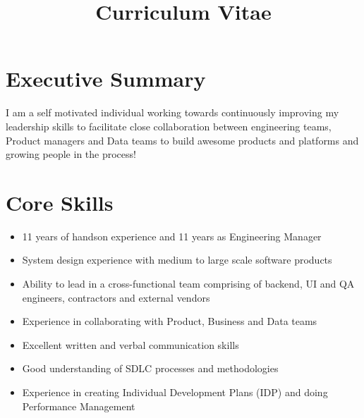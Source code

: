 \documentclass[11pt,a4paper,sans]{moderncv} %
\title{Curriculum Vitae}
\begin{document}
\makecvtitle %

\section{Executive Summary}
I am a self motivated individual working towards continuously improving my leadership skills to facilitate close collaboration between engineering teams, Product managers and Data teams to build awesome products and platforms and growing people in the process!

\section{Core Skills}
\begin{multicols}{2}
    \begin{itemize}
        \item 11 years of handson experience and 11 years as Engineering Manager
        \item System design experience with medium to large scale software products
        \item Ability to lead in a cross-functional team comprising of backend, UI and QA engineers, contractors and external vendors
        \item Experience in collaborating with Product, Business and Data teams
        \item Excellent written and verbal communication skills
        \item Good understanding of SDLC processes and methodologies
        \item Experience in creating Individual Development Plans (IDP) and doing Performance Management
    \end{itemize}
\end{multicols}

\end{document}
